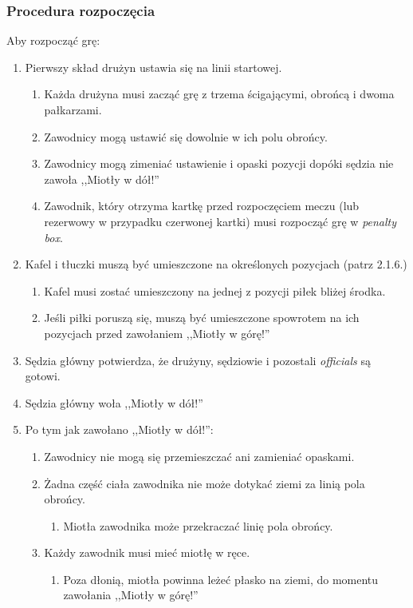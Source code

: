 \documentclass[11pt,a4paper]{article}
\begin{document}
\subsubsection{Procedura rozpoczęcia}
Aby rozpocząć grę:
\begin{enumerate}
  \item Pierwszy skład drużyn ustawia się na linii startowej.
  \begin{enumerate}
    \item Każda drużyna musi zacząć grę z trzema ścigającymi, obrońcą i dwoma pałkarzami.
    \item Zawodnicy mogą ustawić się dowolnie w ich polu obrońcy.
    \item Zawodnicy mogą zimeniać ustawienie i opaski pozycji dopóki sędzia nie zawoła ,,Miotły w dół!''
    \item Zawodnik, który otrzyma kartkę przed rozpoczęciem meczu (lub rezerwowy w przypadku czerwonej kartki) musi rozpocząć grę w \emph{penalty box}.
  \end{enumerate}
  \item Kafel i tłuczki muszą być umieszczone na określonych pozycjach (patrz 2.1.6.) %
  \begin{enumerate}
    \item Kafel musi zostać umieszczony na jednej z pozycji piłek bliżej środka.
    \item Jeśli piłki poruszą się, muszą być umieszczone spowrotem na ich pozycjach przed zawołaniem ,,Miotły w górę!''
  \end{enumerate}
  \item Sędzia główny potwierdza, że drużyny, sędziowie i pozostali \emph{officials} są gotowi.
  \item Sędzia główny woła ,,Miotły w dół!''
  \item Po tym jak zawołano ,,Miotły w dół!'':
  \begin{enumerate}
    \item Zawodnicy nie mogą się przemieszczać ani zamieniać opaskami.
    \item Żadna część ciała zawodnika nie może dotykać ziemi za linią pola obrońcy.
    \begin{enumerate}
      \item Miotła zawodnika może przekraczać linię pola obrońcy.
    \end{enumerate}
    \item Każdy zawodnik musi mieć miotłę w ręce.
    \begin{enumerate}
      \item Poza dłonią, miotła powinna leżeć płasko na ziemi, do momentu zawołania ,,Miotły w górę!''

\end{enumerate}
\end{enumerate}
\end{enumerate}
\end{document}
